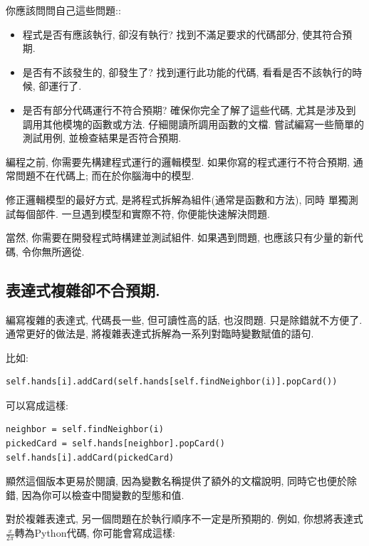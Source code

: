 \documentclass[10pt]{book}
\begin{document}
你應該問問自己這些問題::

\begin{itemize}

\item 程式是否有應該執行, 卻沒有執行?
找到不滿足要求的代碼部分, 使其符合預期. 

\item 是否有不該發生的, 卻發生了?
找到運行此功能的代碼, 看看是否不該執行的時候, 卻運行了. 

\item 是否有部分代碼運行不符合預期? 
確保你完全了解了這些代碼, 尤其是涉及到調用其他模塊的函數或方法. 
仔細閱讀所調用函數的文檔. 
嘗試編寫一些簡單的測試用例, 並檢查結果是否符合預期. 
\end{itemize}

編程之前, 你需要先構建程式運行的邏輯模型. 
如果你寫的程式運行不符合預期, 
通常問題不在代碼上; 而在於你腦海中的模型. 

修正邏輯模型的最好方式, 是將程式拆解為組件(通常是函數和方法), 同時
單獨測試每個部件. 
一旦遇到模型和實際不符, 你便能快速解決問題. 

當然, 你需要在開發程式時構建並測試組件. 
如果遇到問題, 也應該只有少量的新代碼, 令你無所適從. 


\subsection{表達式複雜卻不合預期.}

編寫複雜的表達式, 代碼長一些, 但可讀性高的話, 也沒問題.
只是除錯就不方便了. 
通常更好的做法是, 將複雜表達式拆解為一系列對臨時變數賦值的語句. 

比如:

\begin{verbatim}
self.hands[i].addCard(self.hands[self.findNeighbor(i)].popCard())
\end{verbatim}
%
可以寫成這樣:

\begin{verbatim}
neighbor = self.findNeighbor(i)
pickedCard = self.hands[neighbor].popCard()
self.hands[i].addCard(pickedCard)
\end{verbatim}
%

顯然這個版本更易於閱讀, 因為變數名稱提供了額外的文檔說明, 
同時它也便於除錯, 因為你可以檢查中間變數的型態和值. 

對於複雜表達式, 另一個問題在於執行順序不一定是所預期的. 
例如, 你想將表達式$\frac{x}{2 \pi}$轉為Python代碼, 
你可能會寫成這樣:
\end{document}
